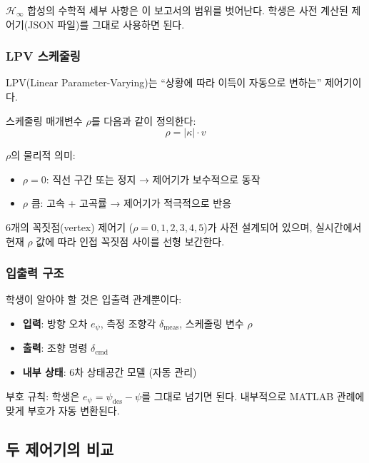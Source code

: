 $\mathcal{H}_\infty$ 합성의 수학적 세부 사항은 이 보고서의 범위를 벗어난다.
학생은 사전 계산된 제어기(JSON 파일)를 그대로 사용하면 된다.

\subsubsection{LPV 스케줄링}

LPV(Linear Parameter-Varying)는 ``상황에 따라 이득이 자동으로 변하는''
제어기이다.

스케줄링 매개변수 $\rho$를 다음과 같이 정의한다:
\begin{equation}
    \rho = |\kappa| \cdot v
\end{equation}

$\rho$의 물리적 의미:
\begin{itemize}[nosep]
    \item $\rho = 0$: 직선 구간 또는 정지 → 제어기가 보수적으로 동작
    \item $\rho$ 큼: 고속 + 고곡률 → 제어기가 적극적으로 반응
\end{itemize}

6개의 꼭짓점(vertex) 제어기 ($\rho = 0, 1, 2, 3, 4, 5$)가 사전 설계되어 있으며,
실시간에서 현재 $\rho$ 값에 따라 인접 꼭짓점 사이를 선형 보간한다.

\subsubsection{입출력 구조}

학생이 알아야 할 것은 입출력 관계뿐이다:

\begin{itemize}[nosep]
    \item \textbf{입력}: 방향 오차 $e_\psi$, 측정 조향각 $\delta_\text{meas}$, 스케줄링 변수 $\rho$
    \item \textbf{출력}: 조향 명령 $\delta_\text{cmd}$
    \item \textbf{내부 상태}: 6차 상태공간 모델 (자동 관리)
\end{itemize}

부호 규칙: 학생은 $e_\psi = \psi_\text{des} - \psi$를 그대로 넘기면 된다.
내부적으로 MATLAB 관례에 맞게 부호가 자동 변환된다.

\subsection{두 제어기의 비교}

